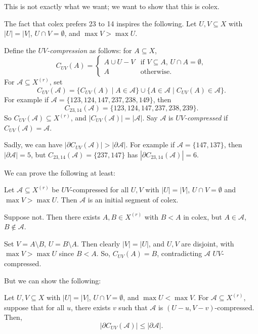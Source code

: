 \documentclass[12pt]{article}
\begin{document}
This is not exactly what we want; we want to show that this is colex.

The fact that colex prefers 23 to 14 inspires the following. Let $U, V \subseteq X$ with $|U| = |V|$, $U \cap V = \emptyset$, and $\max V > \max U$.

Define the \emph{$UV$-compression} as follows: for $A \subseteq X$,
\[
C_{UV}(A) =
\begin{cases}
	A \cup U - V & \text{if $V \subseteq A$, $U \cap A = \emptyset$}, \\
	A &\text{otherwise}.
\end{cases}
\]
For $\mathcal{A}\subseteq X^{(r)}$, set
\[
	C_{UV}(\mathcal{A}) = \{C_{UV}(A) \mid A \in \mathcal{A}\} \cup \{A \in \mathcal{A} \mid C_{UV}(A) \in \mathcal{A}\}.
\]
For example if $\mathcal{A} = \{123, 124, 147, 237, 238, 149\}$, then
\[
C_{23, 14}(\mathcal{A}) = \{123, 124, 147, 237, 238, 239\}.
\]
So $C_{UV}(\mathcal{A}) \subseteq X^{(r)}$, and $|C_{UV}(\mathcal{A})| = |\mathcal{A}|$. Say $\mathcal{A}$ is \emph{$UV$-compressed} if $C_{UV}(\mathcal{A}) = \mathcal{A}$.

Sadly, we can have $|\partial C_{UV}(\mathcal{A})| > |\partial \mathcal{A}|$. For example if $\mathcal{A} = \{147, 137\}$, then $|\partial \mathcal{A}| = 5$, but $C_{23,14}(\mathcal{A}) = \{237, 147\}$ has $|\partial C_{23, 14}(\mathcal{A})| = 6$.

We can prove the following at least:

\begin{lemma}
	Let $\mathcal{A} \subseteq X^{(r)}$ be $UV$-compressed for all $U, V$ with $|U| = |V|$, $U \cap V = \emptyset$ and $\max V > \max U$. Then $\mathcal{A}$ is an initial segment of colex.
\end{lemma}

\begin{proofbox}
	Suppose not. Then there exists $A, B \in X^{(r)}$ with $B < A$ in colex, but $A \in \mathcal{A}$, $B \not \in \mathcal{A}$. 

	Set $V = A \setminus B$, $U = B \setminus A$. Then clearly $|V| = |U|$, and $U, V$ are disjoint, with $\max V > \max U$ since $B < A$. So, $C_{UV}(A) = B$, contradicting $\mathcal{A}$ $UV$-compressed.
\end{proofbox}


But we can show the following:

\begin{lemma}
	Let $U, V \subseteq X$ with $|U| = |V|$, $U \cap V = \emptyset$, and $\max U < \max V$. For $\mathcal{A} \subseteq X^{(r)}$, suppose that for all $u$, there exists $v$ such that $\mathcal{A}$ is $(U - u, V - v)$-compressed. Then,
	\[
	|\partial C_{UV}(\mathcal{A})| \leq |\partial \mathcal{A}|.
	\]
\end{lemma}
\end{document}
